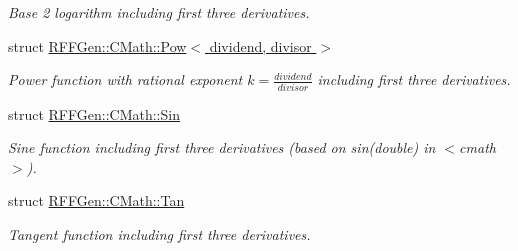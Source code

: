 \begin{DoxyCompactItemize}
\begin{DoxyCompactList}\small\item\em Base 2 logarithm including first three derivatives. \end{DoxyCompactList}\item 
struct \hyperlink{structRFFGen_1_1CMath_1_1Pow}{R\-F\-F\-Gen\-::\-C\-Math\-::\-Pow$<$ dividend, divisor $>$}
\begin{DoxyCompactList}\small\item\em Power function with rational exponent $ k = \frac{dividend}{divisor} $ including first three derivatives. \end{DoxyCompactList}\item 
struct \hyperlink{structRFFGen_1_1CMath_1_1Sin}{R\-F\-F\-Gen\-::\-C\-Math\-::\-Sin}
\begin{DoxyCompactList}\small\item\em Sine function including first three derivatives (based on sin(double) in $<$cmath$>$). \end{DoxyCompactList}\item 
struct \hyperlink{structRFFGen_1_1CMath_1_1Tan}{R\-F\-F\-Gen\-::\-C\-Math\-::\-Tan}
\begin{DoxyCompactList}\small\item\em Tangent function including first three derivatives. \end{DoxyCompactList}\end{DoxyCompactItemize}
